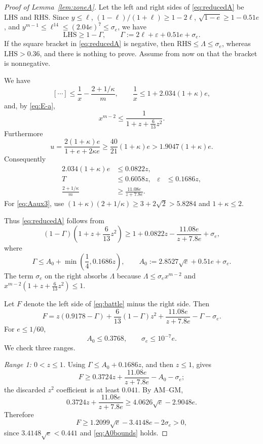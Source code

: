 \documentclass[11pt]{article}
\newcommand{\eps}{\varepsilon}
\begin{document}
\begin{proof}[Proof of Lemma~\ref{lem:zoneA}]
Let the left and right sides of \eqref{eq:reducedA} be $\mathrm{LHS}$ and
$\mathrm{RHS}$.  Since $y\le\ell$,
$(1-\ell)/(1+\ell)\ge1-2\ell$,
$\sqrt{1-e}\ge1-0.51e$, and
$y^{m-1}\le\ell^{14}\le(2.04e)^7\le\sigma_e$, we have
\begin{equation}\label{eq:GammaA}
        \mathrm{LHS}\ge1-\Gamma,
        \qquad
        \Gamma:=2\ell+\eps+0.51e+\sigma_e.
\end{equation}
If the square bracket in \eqref{eq:reducedA} is negative, then
$\mathrm{RHS}\le\Lambda\le\sigma_e$, whereas
$\mathrm{LHS}>0.36$, and there is nothing to prove.  Assume from now on that
the bracket is nonnegative.

We have
\[
 \left[\cdots\right]
 \le\frac1x-\frac{2+1/\kappa}{m},
 \qquad
 \frac1x\le1+2.034(1+\kappa)e,
\]
and, by \eqref{eq:E-a},
\[
        x^{m-2}\le\frac1{1+z+\frac6{13}z^2}.
\]
Furthermore
\[
 u=\frac{2(1+\kappa)e}{1+e+2\kappa e}
 \ge\frac{40}{21}(1+\kappa)e>1.9047(1+\kappa)e.
\]
Consequently
\begin{align}
 2.034(1+\kappa)e&\le0.0822z,\label{eq:Aaux1}\\
 T&\le0.6058z,
 &\eps&\le0.1686z,\label{eq:Aaux2}\\
 \frac{2+1/\kappa}{m}
 &\ge\frac{11.08e}{z+7.8e}.\label{eq:Aaux3}
\end{align}
For \eqref{eq:Aaux3}, use
$(1+\kappa)(2+1/\kappa)\ge3+2\sqrt2>5.8284$ and
$1+\kappa\le2$.

Thus \eqref{eq:reducedA} follows from
\begin{equation}\label{eq:battle}
 (1-\Gamma)\left(1+z+\frac6{13}z^2\right)
 \ge1+0.0822z-\frac{11.08e}{z+7.8e}+\sigma_e,
\end{equation}
where
\[
 \Gamma\le A_0+\min\left(\frac14,0.1686z\right),
 \qquad
 A_0:=2.8527\sqrt e+0.51e+\sigma_e.
\]
The term $\sigma_e$ on the right absorbs $\Lambda$ because
$\Lambda\le\sigma_e x^{m-2}$ and
$x^{m-2}(1+z+\frac6{13}z^2)\le1$.

Let $F$ denote the left side of \eqref{eq:battle} minus the right side.  Then
\[
 F=z(0.9178-\Gamma)+\frac6{13}(1-\Gamma)z^2
   +\frac{11.08e}{z+7.8e}-\Gamma-\sigma_e.
\]
For $e\le1/60$,
\begin{equation}\label{eq:A0bounds}
        A_0\le0.3768,
        \qquad
        \sigma_e\le10^{-7}e.
\end{equation}
We check three ranges.

\smallskip\noindent
\emph{Range 1: $0<z\le1$.}
Using $\Gamma\le A_0+0.1686z$, and then $z\le1$, gives
\[
 F\ge0.3724z+\frac{11.08e}{z+7.8e}-A_0-\sigma_e;
\]
the discarded $z^2$ coefficient is at least $0.041$.  By AM--GM,
\[
 0.3724z+\frac{11.08e}{z+7.8e}
 \ge4.0626\sqrt e-2.9048e.
\]
Therefore
\[
 F\ge1.2099\sqrt e-3.4148e-2\sigma_e>0,
\]
since $3.4148\sqrt e<0.441$ and \eqref{eq:A0bounds} holds.


\end{proof}
\end{document}
